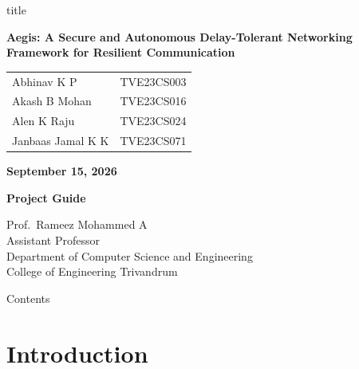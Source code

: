 \documentclass[11pt,aspectratio=43]{beamer}
\begin{document}
\begin{frame}
\centering

\begin{beamercolorbox}[
    wd=1\textwidth,
    rounded=true,
    shadow=true,
    sep=9pt,
    center
]{title}

\Large\bfseries
Aegis: A Secure and Autonomous
Delay-Tolerant Networking Framework
for Resilient Communication

\end{beamercolorbox}


\vspace{0.5cm}

\small
\begin{tabular}{l l}
Abhinav K P & TVE23CS003 \\
Akash B Mohan & TVE23CS016   \\
Alen K Raju & TVE23CS024 \\
Janbaas Jamal K K & TVE23CS071 \\
\end{tabular}

\vspace{0.4cm}


\normalsize \textbf{September 15, 2026}

\vspace{0.3cm}
\normalsize
\textbf{Project Guide}

\vspace{0.1cm}

\small
Prof.\ Rameez Mohammed A\\
Assistant Professor\\
Department of Computer Science and Engineering\\
College of Engineering Trivandrum

\end{frame}

\begin{frame}{Contents}
\tableofcontents
\end{frame}

\section{Introduction}
\end{document}

